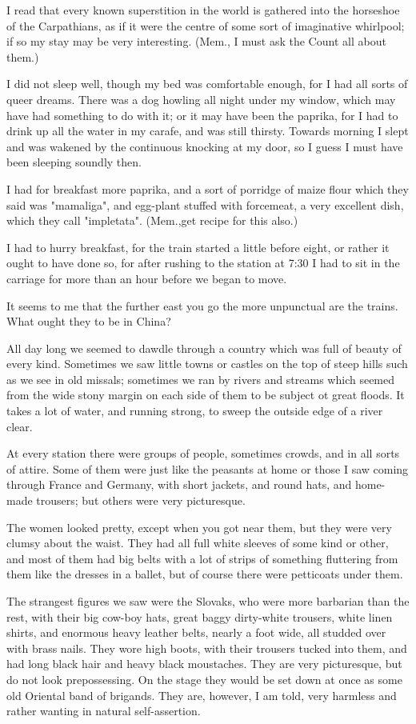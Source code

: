 I read that every known superstition in the world is gathered into the horseshoe of the Carpathians, as if it were the centre of some sort of imaginative whirlpool; if so my stay may be very interesting. (Mem., I must ask the Count all about them.)

I did not sleep well, though my bed was comfortable enough, for I had all sorts of queer dreams. There was a dog howling all night under my window, which may have had something to do with it; or it may have been the paprika, for I had to drink up all the water in my carafe, and was still thirsty. Towards morning I slept and was wakened by the continuous knocking at my door, so I guess I must have been sleeping soundly then.

I had for breakfast more paprika, and a sort of porridge of maize flour which they said was "mamaliga", and egg-plant stuffed with forcemeat, a very excellent dish, which they call "impletata". (Mem.,get recipe for this also.)

I had to hurry breakfast, for the train started a little before eight, or rather it ought to have done so, for after rushing to the station at 7:30 I had to sit in the carriage for more than an hour before we began to move.

It seems to me that the further east you go the more unpunctual are the trains. What ought they to be in China?

All day long we seemed to dawdle through a country which was full of beauty of every kind. Sometimes we saw little towns or castles on the top of steep hills such as we see in old missals; sometimes we ran by rivers and streams which seemed from the wide stony margin on each side of them to be subject ot great floods. It takes a lot of water, and running strong, to sweep the outside edge of a river clear.

At every station there were groups of people, sometimes crowds, and in all sorts of attire. Some of them were just like the peasants at home or those I saw coming through France and Germany, with short jackets, and round hats, and home-made trousers; but others were very picturesque.

The women looked pretty, except when you got near them, but they were very clumsy about the waist. They had all full white sleeves of some kind or other, and most of them had big belts with a lot of strips of something fluttering from them like the dresses in a ballet, but of course there were petticoats under them.

The strangest figures we saw were the Slovaks, who were more barbarian than the rest, with their big cow-boy hats, great baggy dirty-white trousers, white linen shirts, and enormous heavy leather belts, nearly a foot wide, all studded over with brass nails. They wore high boots, with their trousers tucked into them, and had long black hair and heavy black moustaches. They are very picturesque, but do not look prepossessing. On the stage they would be set down at once as some old Oriental band of brigands. They are, however, I am told, very harmless and rather wanting in natural self-assertion.

